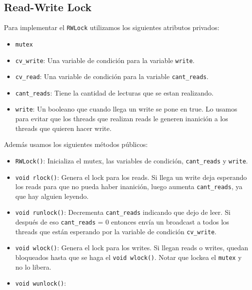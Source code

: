\documentclass[hidelinks,a4paper,12pt, nofootinbib]{article}
\begin{document}
\maketitle
\tableofcontents
\newpage

\subsection{Read-Write Lock}
Para implementar el \texttt{RWLock} utilizamos los siguientes atributos privados:
\begin{itemize}
	\item \texttt{mutex}
	\item \texttt{cv\_write}: Una variable de condición para la variable \texttt{write}. 
	\item \texttt{cv\_read}: Una variable de condición para la variable \texttt{cant\_reads}.
	\item \texttt{cant\_reads}: Tiene la cantidad de lecturas que se estan realizando.
	\item \texttt{write}: Un booleano que cuando llega un write se pone en true. Lo usamos para evitar que los threads que realizan reads le generen inanición a los threads que quieren hacer write.
\end{itemize}

Además usamos los siguientes métodos públicos:
\begin{itemize}
	\item \texttt{RWLock()}: Inicializa el mutex, las variables de condición, \texttt{cant\_reads} y \texttt{write}.
	\item \texttt{void rlock()}: Genera el lock para los reads. Si llega un write deja esperando los reads para que no pueda haber inanición, luego aumenta \texttt{cant\_reads}, ya que hay alguien leyendo. 
	\item \texttt{void runlock()}: Decrementa \texttt{cant\_reads} indicando que dejo de leer. Si después de eso \texttt{cant\_reads} = 0 entonces envía un broadcast a todos los threads que están esperando por la variable de condición \texttt{cv\_write}.
	\item \texttt{void wlock()}: Genera el lock para los writes. Si llegan reads o writes, quedan bloqueados hasta que se haga el  \texttt{void wlock()}. Notar que lockea el \texttt{mutex} y no lo libera.
	\item \texttt{void wunlock()}: 
\end{itemize}
\end{document}
